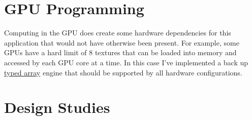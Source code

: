 {\section{GPU Programming}

Computing in the GPU does create some hardware dependencies for this application that would not have otherwise been present.  For example, some GPUs have a hard limit of 8 textures that can be loaded into memory and accessed by each GPU core at a time.  In this case I've implemented a back up \href{https://developer.mozilla.org/en-US/docs/Web/JavaScript/Typed_arrays}{typed array} engine that should be supported by all hardware configurations.

}

\section{Design Studies}
